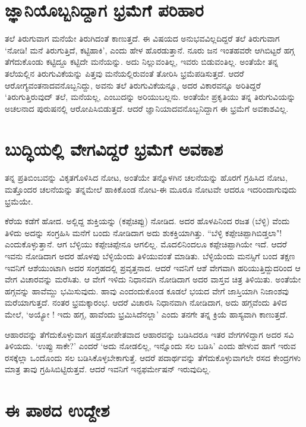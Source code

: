 \section*{ಜ್ಞಾನಿಯೊಬ್ಬನಿದ್ದಾಗ ಭ್ರಮೆಗೆ ಪರಿಹಾರ}

ತಲೆ ತಿರುಗುವಾಗ ಮನೆಯೇ ತಿರುಗಿದಂತೆ ಕಾಣುತ್ತದೆ. ಈ ವಿಷಯದ ಅನುಭವವಿಲ್ಲದಿದ್ದರೆ ತಲೆ ತಿರುಗುವಾಗ `ನೋಡಿ! ಮನೆ ತಿರುಗುತ್ತಿದೆ, ಕಟ್ಟಿಹಾಕಿ', ಎಂದು ಹೇಳ ಹೊರಡುತ್ತಾನೆ. ನೂರು ಜನ ಇಂತಹವರೇ ಆಗಿಬಿಟ್ಟರೆ ಹಗ್ಗ ತೆಗೆದುಕೊಂಡು ಕಟ್ಟಿದ್ದೂ ಕಟ್ಟಿದೇ ಮನೆಯನ್ನು. ಅದು ನಿಲ್ಲುವಂತಿಲ್ಲ, ಇವರು ಬಿಡುವಂತಿಲ್ಲ. ಅಂತೆಯೇ ತನ್ನ ತಲೆಯಲ್ಲಿನ ತಿರುಗುವಿಕೆಯನ್ನು ಪಿತ್ತವು ಮನೆಯಲ್ಲಿರುವಂತೆ ತೋರಿಸಿ ಭ್ರಮೆಪಡಿಸುತ್ತದೆ. ಆದರೆ ಆರೋಗ್ಯವಂತನಾದವನೊಬ್ಬನಿದ್ದು, ಅವನು ತಲೆ ತಿರುಗುವಿಕೆಯನ್ನೂ, ಅದರ ವಿಕಾರವನ್ನೂ ಅರಿತಿದ್ದರೆ `ತಿರುಗುತ್ತಿರುವುದ್ ತಲೆ, ಮನೆಯಲ್ಲ, ಎಂಬುದನ್ನು ಅರಿಯುಬಲ್ಲನು. ಅಂತೆಯೇ ಪ್ರಕೃತಿಯು ತನ್ನ ತಿರುಗುವಿಯನ್ನು ಅಚಲನಾದ ಪುರುಷನಲ್ಲಿ ಆರೋಪಿಸಿಬಿಡುತ್ತದೆ. ಆದರೆ ಜ್ಞಾನಿಯಾದವನೊಬ್ಬನಿದ್ದಾಗ ಈ ಭ್ರಮೆಗೆ ಅವಕಾಶವಿಲ್ಲ.

\section*{ಬುದ್ಧಿಯಲ್ಲಿ ವೇಗವಿದ್ದರೆ ಭ್ರಮೆಗೆ ಅವಕಾಶ}
ತನ್ನ ಪ್ರತಿಬಿಂಬವನ್ನು ವಿಕೃತಗೊಳಿಸಿದ ನೋಟ, ಅಂತೆಯೇ ತನ್ನೊಳಗಿನ ಚಲನೆಯನ್ನು ಹೊರಗೆ ಗ್ರಹಿಸಿದ ನೋಟ, ಮತ್ತೊಂದರ ಚಲನೆಯನ್ನು  ತನ್ನಮೇಲೆ ಹಾಕಿಕೊಂಡ ನೋಟ-ಈ ಮೂರೂ ನೋಟವೇ ಆದರೂ ಇದರಿಂದಾಗುವುದು ಭ್ರಮೆಯೇ.

ಕೆರೆಯ ಕಡೆಗೆ ಹೋದ. ಅಲ್ಲಿದ್ದ ಶುಕ್ತಿಯನ್ನು (ಕಪ್ಪೆಚಿಪ್ಪು) ನೋಡಿದ. ಅದರ ಹೊಳಪಿನಿಂದ ರಜತ (ಬೆಳ್ಳಿ) ವೆಂದು ತಿಳಿದು ಅದನ್ನು ಸಂಗ್ರಹಿಸಿ ಮನೆಗೆ ಬಂದು ನೋಡಿದಾಗ ಅದು ಶುಕಕ್ತಿಯಾಗಿತ್ತು. ``ಬೆಳ್ಳಿ ಕಪ್ಪೇಚಿಪ್ಪಾಗಿಬಿಡ್ತಲಾ"! ಎಂದುಕೊಳ್ಳುತ್ತಾನೆ. ಆಗ ಬೆಳ್ಳಿಯು ಕಪ್ಪೇಚಿಪ್ಪೇನೂ ಆಗಲಿಲ್ಲ. ಮೊದಲಿನಿಂದಲೂ ಕಪ್ಪೇಚಿಪ್ಪಾಗಿಯೇ ಇದೆ. ಆದರೆ ಇವನು ನೋಡಿದಾಗ ಅದರ ಹೊಳಪು ಬೆಳ್ಳಿಯೆಂದು ತಿಳಿಯುವಂತೆ ಮಾಡಿತು. ಬೆಳ್ಳಿಯೆಂದು ಮನಸ್ಸಿಗೆ ಬಂದ ತಕ್ಷಣ ಇವನಿಗೆ ಆಶೆಯುಂಟಾಗಿ ಅದರ ಸಂಗ್ರಹದಲ್ಲಿ ಪ್ರವೃತ್ತನಾದ. ಆದರೆ ಇವನಿಗೆ ಆಶೆ ವೇಗವಾಗಿ ಹರಿಯುತ್ತಿದ್ದುದರಿಂದ ಆ ವೇಗ ವಿಚಾರವನ್ನು ಮರೆಸಿತು. ಆ ವೇಗೆ ಇಳಿದು ನಿಧಾನವಗಿ ನೋಡಿದಾಗ ಅದರ ವಾಸ್ತವ ಚಿತ್ರ ತಿಳಿಯಿತು. ಅಂತೆಯೇ ಹಗ್ಗವನ್ನು ಹಾವೆಮ್ದು  ಭಮಿಸುವುದು. ಹಾವು ಎಂದಂದುಕೊಂಡ ಕೂಡಲೆ ಭಯದ ವೇಗೆ ಜಾಸ್ತಿಯಾಗಿ ನಿಜಾಂಶವು ಮರೆಯಾಗುತ್ತದೆ. ನಂತರ ಭ್ರಮಕ್ಕಾರಂಭ. ಆದರೆ ವಿಚಾರಸಿ ನಿಧಾನವಾಗಿ ನೋಡಿದಾಗ, ಅದು ಹಗ್ಗವೆಂದು ತಿಳಿದ ಮೇಲೆ, `ಅಯ್ಯೋ ! ಇದು ಹಗ್ಗ, ಹಾವೆಂದು ಭ್ರಮಿಸಿದೆನಲ್ಲಾ' ಎಂದು ತನಗೇ ತನ್ನ ಕ್ರಿಯೆ ಹಾಸ್ಯವಾಗಿ ಕಾಣುತ್ತದೆ.

ಆಹಾರವನ್ನು ತೆಗೆದುಕೊಳ್ಳುವಾಗ ಷಡ್ರಸೋಪೇತವಾದ ಆಹಾರವನ್ನು ಬಡಿಸಿದರೂ ಇತರ ವೇಗಗಳಿದ್ದಾಗ ಅದರ ಸವಿ ತಿಳಿಯದು. `ಉಪ್ಪು ಸಾಕೇ?' ಎಂದರೆ `ಅದು ನೋಡಲಿಲ್ಲ, ಇನ್ನೊಂದು ಸಲ ಬಡಿಸಿ' ಎಂದು ಹೇಳುವ ಹಾಗೆ ಇರುವ ರಸಕ್ಕೆಲ್ಲಾ ಒಂದೊಂದು ಸಲ ಬಡಿಸಿಕೊಳ್ಳಬೇಕಾಗುತ್ತೆ. ಆದರೆ ಪದಾರ್ಥವನ್ನು ತೆಗೆದುಕೊಳ್ಳುವಾಗಲೇ ರಸದ ಕೇಂದ್ರಗಳು ಮಾತ್ರ ತಾವು ಗ್ರಹಿಸಿಬಿಟ್ಟಿರುತ್ತವೆ. ಆದರೆ ಇವನಿಗೆ ಇನ್ಫಫರ್ಮೇಷನ್ ಇರುವುದಿಲ್ಲ.

\section*{ಈ ಪಾಠದ ಉದ್ದೇಶ}


